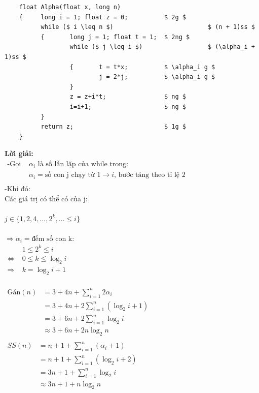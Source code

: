 \documentclass[12pt, letterpaper]{article}
\begin{document}
\begin{lstlisting}
    float Alpha(float x, long n)
    {     long i = 1; float z = 0;          $ 2g $
          while ($ i \leq n $)                          $ (n + 1)ss $
          {       long j = 1; float t = 1;  $ 2ng $
                  while ($ j \leq i $)                  $ (\alpha_i + 1)ss $
                  {       t = t*x;          $ \alpha_i g $
                          j = 2*j;          $ \alpha_i g $
                  }
                  z = z+i*t;                $ ng $
                  i=i+1;                    $ ng $
          }
          return z;                         $ 1g $
    }
\end{lstlisting}
\textbf{Lời giải: } \\
$ \begin{aligned}
		\text{-Gọi } & \alpha_i \text{ là số lần lặp của while trong:}                              \\
		            & \alpha_i = \text{số con j chạy từ 1} \rightarrow i \text{, bước tăng theo tỉ lệ 2} \\
	\end{aligned} $ \\
	-Khi đó:\\
	Các giá trị có thể có của j: \\ \\
	$ j \in \{ 1, 2, 4, \ldots, 2^k, \ldots \leq i \} $ \\ \\
	$ \Rightarrow \alpha_i = \text{đếm số con k:} $ \\ 
$ \begin{aligned}
    & 1 \leq 2^k \leq i \\
    \Leftrightarrow\; & 0 \leq k \leq \log_2{i} \\
    \Rightarrow\; & k = \log_2{i} + 1
\end{aligned} $ \\
 \\
$ \begin{aligned}
    \text{Gán}(n) & = 3 + 4n + \sum^{n}_{i = 1} 2 \alpha_i \\
                  & = 3 + 4n + 2 \sum^{n}_{i = 1} (\log_2{i} + 1) \\
                  & = 3 + 6n + 2 \sum^{n}_{i = 1} \log_2{i} \\
                  & \approx 3 + 6n + 2n \log_2n \\
\end{aligned} $ \\
$ \begin{aligned}
	SS(n) & = n + 1 + \sum^{n}_{i = 1} (\alpha_i + 1)           \\
          & = n + 1 + \sum^{n}_{i = 1} (\log_2{i} + 2)           \\
          & = 3n + 1 + \sum^{n}_{i = 1} \log_2{i}           \\
          & \approx 3n + 1 + n \log_2n           \\
\end{aligned} $ \\
\end{document}
